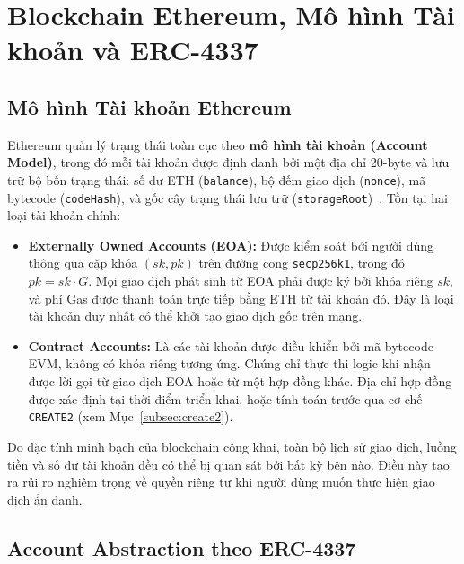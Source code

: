 \documentclass[../DoAn.tex]{subfiles}
\begin{document}
\section{Blockchain Ethereum, Mô hình Tài khoản và ERC-4337}

\subsection{Mô hình Tài khoản Ethereum}

Ethereum quản lý trạng thái toàn cục theo \textbf{mô hình tài khoản (Account Model)}, trong đó mỗi tài khoản được định danh bởi một địa chỉ 20-byte và lưu trữ bộ bốn trạng thái: số dư ETH (\texttt{balance}), bộ đếm giao dịch (\texttt{nonce}), mã bytecode (\texttt{codeHash}), và gốc cây trạng thái lưu trữ (\texttt{storageRoot})~\cite{ethereum_whitepaper}. Tồn tại hai loại tài khoản chính:

\begin{itemize}
    \item \textbf{Externally Owned Accounts (EOA):} Được kiểm soát bởi người dùng thông qua cặp khóa \((sk, pk)\) trên đường cong \texttt{secp256k1}, trong đó \(pk = sk \cdot G\). Mọi giao dịch phát sinh từ EOA phải được ký bởi khóa riêng \(sk\), và phí Gas được thanh toán trực tiếp bằng ETH từ tài khoản đó. Đây là loại tài khoản duy nhất có thể khởi tạo giao dịch gốc trên mạng.

    \item \textbf{Contract Accounts:} Là các tài khoản được điều khiển bởi mã bytecode EVM, không có khóa riêng tương ứng. Chúng chỉ thực thi logic khi nhận được lời gọi từ giao dịch EOA hoặc từ một hợp đồng khác. Địa chỉ hợp đồng được xác định tại thời điểm triển khai, hoặc tính toán trước qua cơ chế \texttt{CREATE2} (xem Mục~\ref{subsec:create2}).
\end{itemize}

Do đặc tính minh bạch của blockchain công khai, toàn bộ lịch sử giao dịch, luồng tiền và số dư tài khoản đều có thể bị quan sát bởi bất kỳ bên nào. Điều này tạo ra rủi ro nghiêm trọng về quyền riêng tư khi người dùng muốn thực hiện giao dịch ẩn danh.

\subsection{Account Abstraction theo ERC-4337}
\label{subsec:erc4337}
\end{document}
